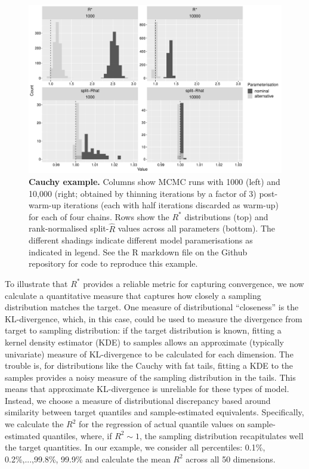 \documentclass{article}
\begin{document}
\begin{figure}[!htb]
	\centerline{\includegraphics[width=1.0\textwidth]{../output/cauchy.pdf}}
	\caption{\textbf{Cauchy example.} Columns show MCMC runs with 1000 (left) and 10,000 (right; obtained by thinning iterations by a factor of 3) post-warm-up iterations (each with half iterations discarded as warm-up) for each of four chains. Rows show the $R^*$ distributions (top) and rank-normalised split-$\widehat{R}$ values across all parameters (bottom). The different shadings indicate different model paramerisations as indicated in legend. See the R markdown file on the Github repository for code to reproduce this example.}
	\label{fig:cauchy}
\end{figure}

To illustrate that $R^*$ provides a reliable metric for capturing convergence, we now calculate a quantitative measure that captures how closely a sampling distribution matches the target. One measure of distributional ``closeness'' is the KL-divergence, which, in this case, could be used to measure the divergence from target to sampling distribution: if the target distribution is known, fitting a kernel density estimator (KDE) to samples allows an approximate (typically univariate) measure of KL-divergence to be calculated for each dimension. The trouble is, for distributions like the Cauchy with fat tails, fitting a KDE to the samples provides a noisy measure of the sampling distribution in the tails. This means that approximate KL-divergence is unreliable for these types of model. Instead, we choose a measure of distributional discrepancy based around similarity between target quantiles and sample-estimated equivalents. Specifically, we calculate the $R^2$ for the regression of actual quantile values on sample-estimated quantiles, where, if $R^2\sim 1$, the sampling distribution recapitulates well the target quantities. In our example, we consider all percentiles: 0.1\%, 0.2\%,...,99.8\%, 99.9\% and calculate the mean $R^2$ across all 50 dimensions.
\end{document}
